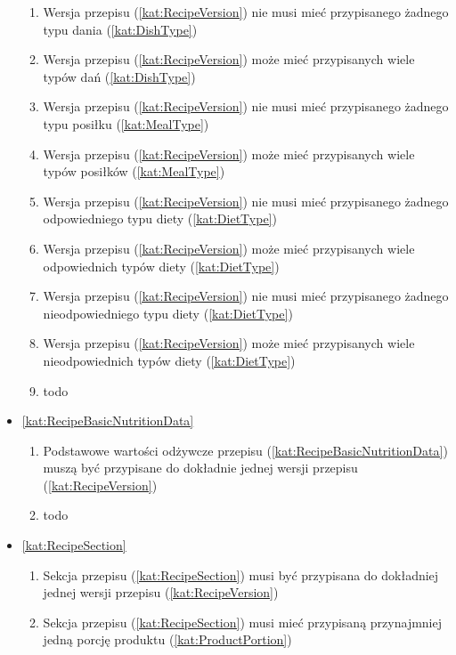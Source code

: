 \begin{itemize}[label={\textbf{Reguły dla}}, wide, labelwidth=!, labelindent=0pt]
\begin{enumerate}[label={\textbf{REG/\protect\threedigits{\arabic{enumi}}}}, wide, labelwidth=!, align=left, leftmargin=3cm, resume]
        \item Wersja przepisu (\ref{kat:RecipeVersion}) nie musi mieć przypisanego żadnego typu dania (\ref{kat:DishType})
        \item Wersja przepisu (\ref{kat:RecipeVersion}) może mieć przypisanych wiele typów dań (\ref{kat:DishType})
        \item Wersja przepisu (\ref{kat:RecipeVersion}) nie musi mieć przypisanego żadnego typu posiłku (\ref{kat:MealType})
        \item Wersja przepisu (\ref{kat:RecipeVersion}) może mieć przypisanych wiele typów posiłków (\ref{kat:MealType})
        \item Wersja przepisu (\ref{kat:RecipeVersion}) nie musi mieć przypisanego żadnego odpowiedniego typu diety (\ref{kat:DietType})
        \item Wersja przepisu (\ref{kat:RecipeVersion}) może mieć przypisanych wiele odpowiednich typów diety  (\ref{kat:DietType})
        \item Wersja przepisu (\ref{kat:RecipeVersion}) nie musi mieć przypisanego żadnego nieodpowiedniego typu diety (\ref{kat:DietType})
        \item Wersja przepisu (\ref{kat:RecipeVersion}) może mieć przypisanych wiele nieodpowiednich typów diety (\ref{kat:DietType})
        \item todo
    \end{enumerate}
    \item\ref{kat:RecipeBasicNutritionData}
    \begin{enumerate}[label={\textbf{REG/\protect\threedigits{\arabic{enumi}}}}, wide, labelwidth=!, align=left, leftmargin=3cm, resume]
        \item Podstawowe wartości odżywcze przepisu (\ref{kat:RecipeBasicNutritionData}) muszą być przypisane do dokładnie jednej wersji przepisu (\ref{kat:RecipeVersion})
        \item todo
    \end{enumerate}
    \item\ref{kat:RecipeSection}
    \begin{enumerate}[label={\textbf{REG/\protect\threedigits{\arabic{enumi}}}}, wide, labelwidth=!, align=left, leftmargin=3cm, resume]
        \item Sekcja przepisu (\ref{kat:RecipeSection}) musi być przypisana do dokładniej jednej wersji przepisu (\ref{kat:RecipeVersion})
        \item Sekcja przepisu (\ref{kat:RecipeSection}) musi mieć przypisaną przynajmniej jedną porcję produktu (\ref{kat:ProductPortion})

\end{enumerate}
\end{itemize}
